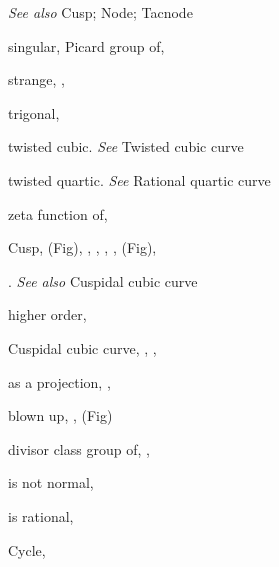{{\noindent\hspace*{15.0bp}\emph{See also} Cusp; Node; Tacnode\par
\noindent\hspace*{7.5bp}singular, Picard group of, \par
\noindent\hspace*{7.5bp}strange, , \par
\noindent\hspace*{7.5bp}trigonal, \par
\noindent\hspace*{7.5bp}twisted cubic. \emph{See} Twisted cubic curve\par
\noindent\hspace*{7.5bp}twisted quartic. \emph{See} Rational quartic curve\par
\noindent\hspace*{7.5bp}zeta function of, \par
\noindent\hspace*{0.0bp}Cusp,  (Fig), , , , ,  (Fig),\par
\noindent\hspace*{15.0bp}. \emph{See also} Cuspidal cubic curve\par
\noindent\hspace*{7.5bp}higher order, \par
\noindent\hspace*{0.0bp}Cuspidal cubic curve, , , \par
\noindent\hspace*{7.5bp}as a projection, , \par
\noindent\hspace*{7.5bp}blown up, ,  (Fig)\par
\noindent\hspace*{7.5bp}divisor class group of, , \par
\noindent\hspace*{7.5bp}is not normal, \par
\noindent\hspace*{7.5bp}is rational, \par
\noindent\hspace*{0.0bp}Cycle, \par
}}
